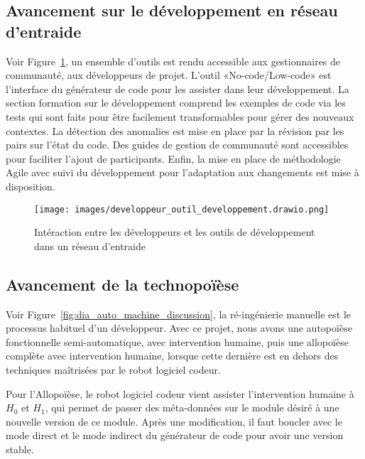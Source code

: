 \subsection{Avancement sur le développement en réseau d'entraide}

Voir Figure~\ref{fig:dia_outil_dev_reseau_entraide}, un ensemble d'outils est rendu accessible aux gestionnaires de communauté, aux développeurs de projet. L'outil «No-code/Low-code» est l'interface du générateur de code pour les assister dans leur développement. La section formation sur le développement comprend les exemples de code via les tests qui sont faits pour être facilement transformables pour gérer des nouveaux contextes. La détection des anomalies est mise en place par la révision par les pairs sur l'état du code. Des guides de gestion de communauté sont accessibles pour faciliter l'ajout de participants. Enfin, la mise en place de méthodologie Agile avec suivi du développement pour l'adaptation aux changements est mise à disposition.

\begin{figure}
\centering
\texttt{[image: images/developpeur\_outil\_developpement.drawio.png]}
\caption{Intéraction entre les développeurs et les outils de développement dans un réseau d'entraide}
\label{fig:dia_outil_dev_reseau_entraide}
\end{figure}

\subsection{Avancement de la technopoïèse}\label{avancement_technopoiese}
Voir Figure~\ref{fig:dia_auto_machine_discussion}, la ré-ingénierie manuelle est le processus habituel d'un développeur. Avec ce projet, nous avons une autopoïèse fonctionnelle semi-automatique, avec intervention humaine, puis une allopoïèse complète avec intervention humaine, lorsque cette dernière est en dehors des techniques maîtrisées par le robot logiciel codeur.

Pour l'Allopoïèse, le robot logiciel codeur vient assister l'intervention humaine à $H_0$ et $H_1$, qui permet de passer des méta-données sur le module désiré à une nouvelle version de ce module. Après une modification, il faut boucler avec le mode direct et le mode indirect du générateur de code pour avoir une version stable.


